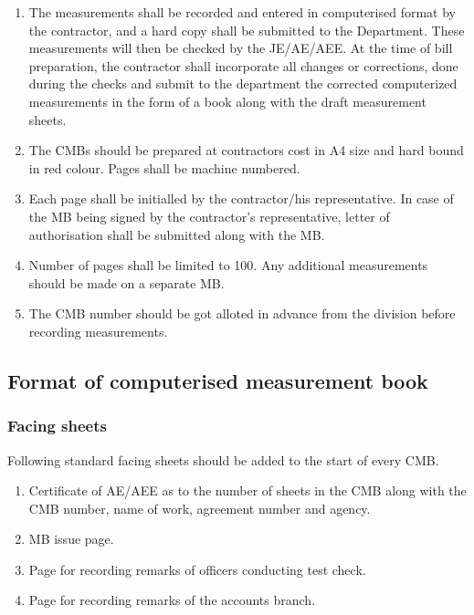 \documentclass[twoside,a4paper]{refart}
\begin{document}
	 \begin{enumerate}
		 \item \attention The measurements shall be recorded and entered in computerised format by the contractor, and a hard copy shall be submitted to the Department. These measurements will then be checked by the JE/AE/AEE. At the time of bill preparation, the contractor shall incorporate all changes or corrections, done during the checks and submit to the department the corrected computerized measurements in the form of a book along with the draft measurement sheets.
		 \item The CMBs should be prepared at contractors cost in A4 size and hard bound in red colour. Pages shall be machine numbered.
		 \item Each page shall be initialled by the contractor/his representative. In case of the MB being signed by the contractor's representative, letter of authorisation shall be submitted along with the MB.
		 \item Number of pages shall be limited to 100. Any additional measurements should be made on a separate MB.
		 \item \attention The CMB number should be got alloted in advance from the division before recording measurements.
	 \end{enumerate}
	 
	 \subsection{Format of computerised measurement book}
	 
	 \subsubsection{Facing sheets}
	 
	 Following standard facing sheets should be added to the start of every CMB.
	 
	 \begin{enumerate}
		 	\item Certificate of AE/AEE as to the number of sheets in the CMB along with the CMB number, name of work, agreement number and agency.
		 	\item MB issue page.
		 	\item Page for recording remarks of officers conducting test check.
		 	\item Page for recording remarks of the accounts branch.
	 \end{enumerate}
	 
\end{document}
